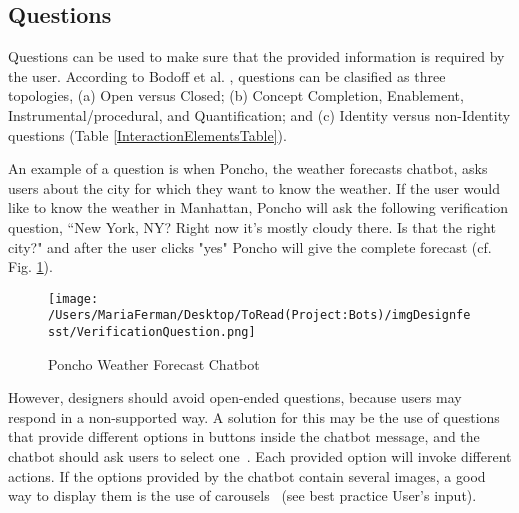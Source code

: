 \documentclass[a4paper,10pt]{article}
\begin{document}
\subsection{Questions}
Questions can be used to make sure that the provided information is required by the user. According to Bodoff et al. \cite{bodoff2016question}, questions can be clasified as three topologies, (a) Open versus Closed; (b) Concept Completion, Enablement, Instrumental/procedural, and Quantification; and (c) Identity versus non-Identity questions (Table \ref{InteractionElementsTable}). 

An example of a question is when Poncho, the weather forecasts chatbot, asks users about the city for which they want to know the weather. If the user would like to know the weather in Manhattan, Poncho will ask the following verification question, ``New York, NY? Right now it's mostly cloudy there. Is that the right city?" and after the user clicks "yes" Poncho will give the complete forecast (cf. Fig. \ref{FigureVerificationQuestion}). 


\begin{figure}
\centering
\texttt{[image: /Users/MariaFerman/Desktop/ToRead(Project:Bots)/imgDesignfesst/VerificationQuestion.png]}
\caption{Poncho Weather Forecast Chatbot}
\label{FigureVerificationQuestion}
\end{figure}

However, designers should avoid open-ended questions, because users may respond in a non-supported way. A solution for this may be the use of questions that provide different options in buttons inside the chatbot message, and the chatbot should ask users to select one~\cite{ConversationalUXDesignFacebook}. Each provided option will invoke different actions. If the options provided by the chatbot contain several images, a good way to display them is the use of carousels~\cite{carousel} (see best practice User's input).

\end{document}
